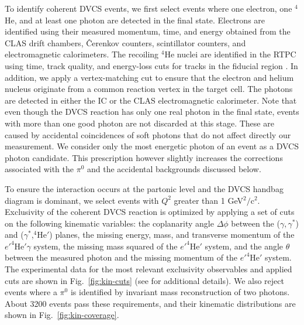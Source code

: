 \documentclass[twocolumn,nofootinbib,showpacs,prl,superscriptaddress,secnumarabic,amssymb,nobibnotes,aps,floatfix]{revtex4}
\begin{document}

To identify coherent DVCS events, we first select events where one electron, 
one $^4$He, and at least one photon are detected in the final state. Electrons 
are identified using their measured momentum, time, and energy obtained from 
the CLAS drift chambers, \^{C}erenkov counters, scintillator counters, 
and electromagnetic calorimeters. The recoiling $^4$He nuclei are identified in 
the RTPC using time, track quality, and energy-loss cuts for tracks in the 
fiducial region \cite{Hattawy:thesis}. In addition, we apply a vertex-matching 
cut to ensure that the 
electron and helium nucleus originate from a common reaction vertex in the 
target cell. The photons are 
detected in either the IC or the CLAS electromagnetic calorimeter. Note that 
even though the DVCS reaction has only one real photon in the final state, 
events with more than one good photon are not discarded at this stage. These
are caused by accidental coincidences of soft photons that do not affect 
directly our measurement. We consider only the most energetic photon of an 
event as a DVCS photon candidate.
This prescription however slightly increases the corrections associated with
the $\pi^0$ and the accidental backgrounds discussed below. 

To ensure the interaction occurs at the partonic level and the DVCS handbag 
diagram is dominant, we select events with $Q^{2}$ greater than 1 
GeV$^{2}/$c$^{2}$. Exclusivity of the coherent DVCS reaction is optimized by 
applying a set of cuts on the following kinematic variables: the coplanarity 
angle $\Delta\phi$ between the ($\gamma,\gamma^*$) 
and ($\gamma^*$,$^4$He$'$) planes, the missing energy, mass, and transverse
momentum of the $e'^4$He$'\gamma$ system, the missing mass squared of 
the $e'^4$He$'$ system, and the angle $\theta$
between the measured photon and the missing momentum of the $e'^4$He$'$ system.  
The experimental data for the most relevant exclusivity observables and applied
cuts are shown in Fig.~\ref{fig:kin-cuts} (see \cite{Hattawy:thesis} for additional details).
We also 
reject events where a $\pi^0$ is identified by invariant mass reconstruction of 
two photons. About 3200 events pass these requirements, and their kinematic 
distributions are shown in Fig.~\ref{fig:kin-coverage}.
\end{document}
